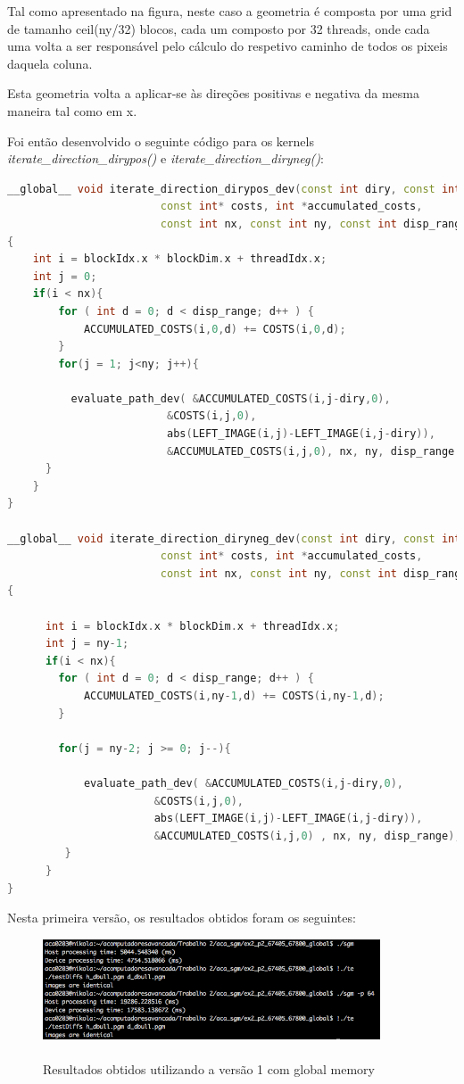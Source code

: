 \documentclass[pdftex,12pt,a4paper]{report}
\begin{document}
Tal como apresentado na figura, neste caso a geometria é composta por uma grid de tamanho ceil(ny/32) blocos, cada um composto por 32 threads, onde cada uma volta a ser responsável pelo cálculo do respetivo caminho de todos os pixeis daquela coluna. 

Esta geometria volta a aplicar-se às direções positivas e negativa da mesma maneira tal como em x.

Foi então desenvolvido o seguinte código para os kernels \textit{iterate\_direction\_dirypos()} e \textit{iterate\_direction\_diryneg()}:

\begin{lstlisting}[language=c++, basicstyle=\scriptsize]
__global__ void iterate_direction_dirypos_dev(const int diry, const int *left_image,
                        const int* costs, int *accumulated_costs,
                        const int nx, const int ny, const int disp_range )
{
    int i = blockIdx.x * blockDim.x + threadIdx.x;
    int j = 0;
    if(i < nx){
        for ( int d = 0; d < disp_range; d++ ) {
            ACCUMULATED_COSTS(i,0,d) += COSTS(i,0,d);
        }
        for(j = 1; j<ny; j++){

          evaluate_path_dev( &ACCUMULATED_COSTS(i,j-diry,0),
                         &COSTS(i,j,0),
                         abs(LEFT_IMAGE(i,j)-LEFT_IMAGE(i,j-diry)),
                         &ACCUMULATED_COSTS(i,j,0), nx, ny, disp_range );
      }
    }
}

__global__ void iterate_direction_diryneg_dev(const int diry, const int *left_image,
                        const int* costs, int *accumulated_costs,
                        const int nx, const int ny, const int disp_range )
{

      int i = blockIdx.x * blockDim.x + threadIdx.x;
      int j = ny-1;
      if(i < nx){
        for ( int d = 0; d < disp_range; d++ ) {
            ACCUMULATED_COSTS(i,ny-1,d) += COSTS(i,ny-1,d);
        }

        for(j = ny-2; j >= 0; j--){

            evaluate_path_dev( &ACCUMULATED_COSTS(i,j-diry,0),
                       &COSTS(i,j,0),
                       abs(LEFT_IMAGE(i,j)-LEFT_IMAGE(i,j-diry)),
                       &ACCUMULATED_COSTS(i,j,0) , nx, ny, disp_range);
         }
      }
}
\end{lstlisting} 

Nesta primeira versão, os resultados obtidos foram os seguintes:

\begin{figure}[!htb]
\center
 \includegraphics[width=100mm,scale=1]{IteratePositionsV1.png}
 \caption{\\ Resultados obtidos utilizando a versão 1 com global memory}
 \label{fig:IteratePositionsV1}
\end{figure}
\end{document}
